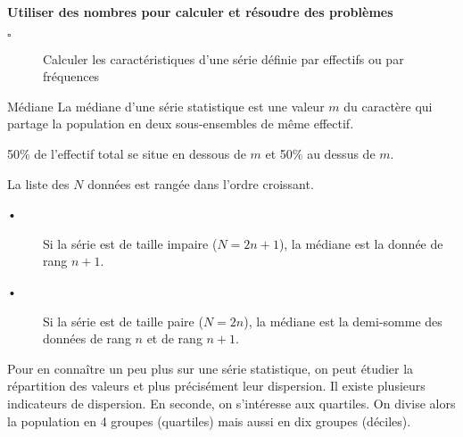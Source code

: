 \begin{titre}

\end{titre}


\begin{CpsCol}
\textbf{Utiliser des nombres pour calculer et résoudre des problèmes}
\begin{description}
\item[$\square$] Calculer les caractéristiques d'une série définie par effectifs ou par fréquences
\end{description}
\end{CpsCol}


\begin{DefT}{Médiane}
La médiane d'une série statistique est une valeur $m$ du caractère qui partage la population en deux sous-ensembles
de même effectif.
\end{DefT}

\begin{Rq}
50\% de l'effectif total se situe en dessous de $m$ et 50\% au dessus de $m$.
\end{Rq}



\begin{Mt}
La liste des $N$ données est rangée dans l'ordre croissant.
\begin{description}
\item[•] Si la série est de taille impaire ($N= 2n + 1$), la médiane est la donnée de rang $n + 1$.
\item[•] Si la série est de taille paire ($N = 2n$), la médiane est la demi-somme des données de rang $n$ et de rang $n+1$.
\end{description}
\end{Mt}

\begin{minipage}{0.48\linewidth}
\end{minipage}
\hfill
\begin{minipage}{0.48\linewidth}
\end{minipage}

\vspace{0.4cm}

Pour en connaître un peu plus sur une série statistique, on peut étudier la répartition des valeurs et plus
précisément leur dispersion. Il existe plusieurs indicateurs de dispersion. En seconde, on s'intéresse aux
quartiles. On divise alors la population en 4 groupes (quartiles) mais aussi en dix groupes (déciles).


